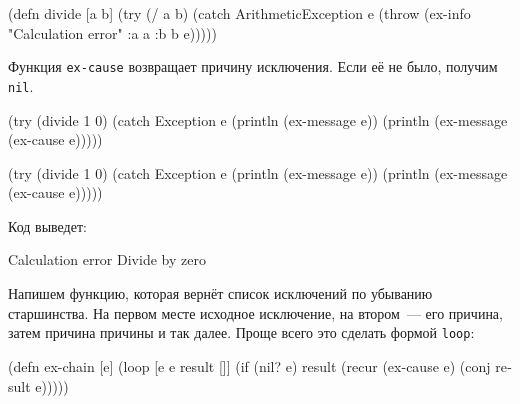 
\label{re-throw-example}

\begin{english}
  \begin{clojure}
(defn divide [a b]
  (try
    (/ a b)
    (catch ArithmeticException e
      (throw (ex-info
               "Calculation error"
               {:a a :b b}
               e)))))
  \end{clojure}
\end{english}

Функция \verb|ex-cause| возвращает причину исключения. Если её не было,
получим \verb|nil|.

\ifx\DEVICETYPE\MOBILE

\begin{english}
  \begin{clojure}
(try
  (divide 1 0)
  (catch Exception e
    (println (ex-message e))
    (println (ex-message
               (ex-cause e)))))
  \end{clojure}
\end{english}

\else

\begin{english}
  \begin{clojure}
(try
  (divide 1 0)
  (catch Exception e
    (println (ex-message e))
    (println (ex-message (ex-cause e)))))
  \end{clojure}
\end{english}

\fi

\noindent
Код выведет:

\begin{english}
  \begin{text}
Calculation error
Divide by zero
  \end{text}
\end{english}

Напишем функцию, которая вернёт список исключений по убыванию
старшинства. На первом месте исходное исключение, на втором~--- его причина, затем
причина причины и так далее. Проще всего это сделать формой \verb|loop|:


\ifx\DEVICETYPE\MOBILE

\begin{english}
  \begin{clojure}
(defn ex-chain [e]
  (loop [e e
         result []]
    (if (nil? e)
      result
      (recur (ex-cause e)
        (conj result e)))))
  \end{clojure}
\end{english}

